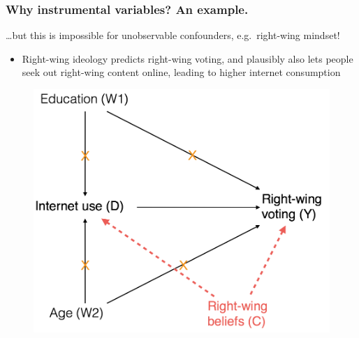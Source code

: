 \documentclass[12pt,english,dvipsnames,aspectratio=169,handout]{beamer}\usepackage[]{graphicx}\usepackage[]{xcolor}
\begin{document}
\begin{frame}
  \frametitle{Why instrumental variables? An example.}
\ldots but this is impossible for unobservable confounders, e.g.\ right-wing mindset!
	\begin{itemize} \scriptsize
		\item Right-wing ideology predicts right-wing voting, and plausibly also lets people seek out right-wing content online, leading to higher internet consumption
	\end {itemize}
	\begin{figure} 
    \includegraphics[height=.45\textheight,keepaspectratio=true]{../04-figures/05/04-w5_dag_4.png}
    \end{figure}
\vspace{3cm}
\end{frame}
\end{document}
